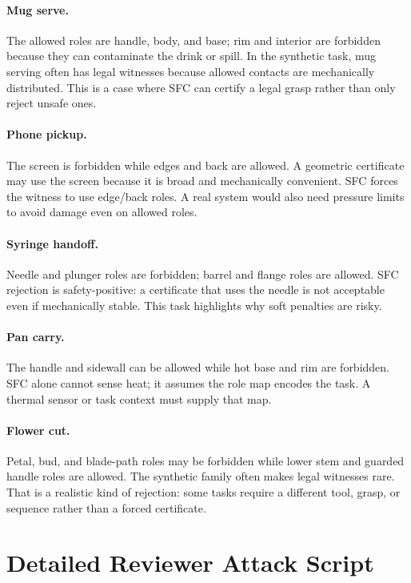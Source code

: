 \documentclass{article}
\begin{document}
\paragraph{Mug serve.}
The allowed roles are handle, body, and base; rim and interior are forbidden because they can contaminate the drink or spill. In the synthetic task, mug serving often has legal witnesses because allowed contacts are mechanically distributed. This is a case where SFC can certify a legal grasp rather than only reject unsafe ones.

\paragraph{Phone pickup.}
The screen is forbidden while edges and back are allowed. A geometric certificate may use the screen because it is broad and mechanically convenient. SFC forces the witness to use edge/back roles. A real system would also need pressure limits to avoid damage even on allowed roles.

\paragraph{Syringe handoff.}
Needle and plunger roles are forbidden; barrel and flange roles are allowed. SFC rejection is safety-positive: a certificate that uses the needle is not acceptable even if mechanically stable. This task highlights why soft penalties are risky.

\paragraph{Pan carry.}
The handle and sidewall can be allowed while hot base and rim are forbidden. SFC alone cannot sense heat; it assumes the role map encodes the task. A thermal sensor or task context must supply that map.

\paragraph{Flower cut.}
Petal, bud, and blade-path roles may be forbidden while lower stem and guarded handle roles are allowed. The synthetic family often makes legal witnesses rare. That is a realistic kind of rejection: some tasks require a different tool, grasp, or sequence rather than a forced certificate.

\section{Detailed Reviewer Attack Script}
\end{document}
